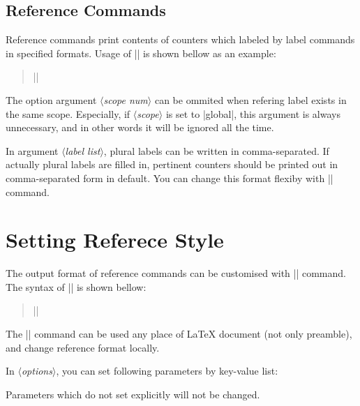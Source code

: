 \documentclass[a4paper]{article}
\newcommand{\Meta}[1]{$\langle$\mbox{}\textit{#1}\mbox{}$\rangle$}
\newenvironment{syntax}{\begin{quote}\small}{\end{quote}}
\begin{document}
\subsection{Reference Commands}

Reference commands print contents of counters which labeled by label commands in specified
formats. Usage of |\exref| is shown bellow as an example:
%
\begin{syntax}
|\exref[|\Meta{scope num}|]{|\Meta{label list}|}|
\end{syntax}

The option argument \Meta{scope num} can be ommited when refering label exists in the
same scope. Especially, if \Meta{scope} is set to |global|, this argument is always
unnecessary, and in other words it will be ignored all the time.

In argument \Meta{label list}, plural labels can be written in comma-separated. If
actually plural labels are filled in, pertinent counters should be printed out in
comma-separated form in default. You can change this format flexiby with |\setrefstyle|
command.

\section{Setting Referece Style}

The output format of reference commands can be customised with |\setrefstyle| command.
The syntax of |\setrefstyle| is shown bellow:
%
\begin{syntax}
|\setrefstyle{|\Meta{ref type}|}{|\Meta{options}|}|
\end{syntax}

The |\setrefstyle| command can be used any place of {\LaTeX} document (not only preamble),
and change reference format locally.

In \Meta{options}, you can set following parameters by key-value list:
%

Parameters which do not set explicitly will not be changed.
\end{document}
